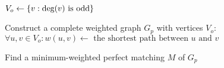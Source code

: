 
\begin{algorithm}[H]
  \begin{algorithmic}[1]
    \State $V_{o} \gets \left\{v: \text{deg}(v) \text{ is odd}\right\}$  

    \hStatex
    \State Construct a complete weighted graph $G_{p}$ with vertices $V_{o}$:
    \State \qquad $\forall u, v \in V_{o}: w(u,v) \gets \text{ the shortest path between $u$ and $v$}$ 

    \hStatex
    \State Find a minimum-weighted perfect matching $M$ of $G_p$
  \end{algorithmic}
\end{algorithm}
